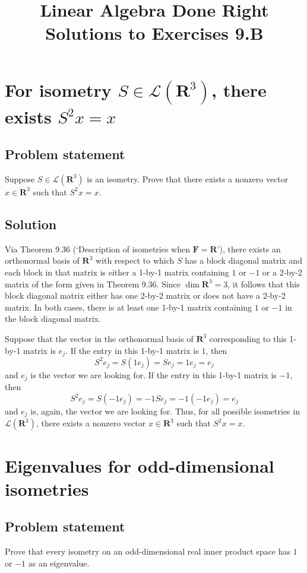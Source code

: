 \documentclass{article}
\title{Linear Algebra Done Right\\Solutions to Exercises 9.B}
\author{}
\date{}
\begin{document}
\maketitle

\section{For isometry $S\in\mathcal{L}(\mathbf{R}^3)$, there exists $S^2x=x$}
\subsection*{Problem statement}
Suppose $S\in\mathcal{L}(\mathbf{R}^3)$ is an isometry. 
Prove that there exists a nonzero vector $x\in\mathbf{R}^3$ such that $S^2x=x$.

\subsection*{Solution}
Via Theorem 9.36 (`Description of isometries when $\mathbf{F}=\mathbf{R}$'), there exists an orthonormal basis of $\mathbf{R}^3$ with respect to which $S$ has a block diagonal matrix and each block in that matrix is either a 1-by-1 matrix containing $1$ or $-1$ or a 2-by-2 matrix of the form given in Theorem 9.36. 
Since $\operatorname{dim}\mathbf{R}^3=3$, it follows that this block diagonal matrix either has one 2-by-2 matrix or does not have a 2-by-2 matrix. In both cases, there is at least one 1-by-1 matrix containing $1$ or $-1$ in the block diagonal matrix. 

Suppose that the vector in the orthonormal basis of $\mathbf{R}^3$ corresponding to this 1-by-1 matrix is $e_j$. 
If the entry in this 1-by-1 matrix is $1$, then 
\[S^2e_j=S(1e_j)=Se_j=1e_j=e_j\]
and $e_j$ is the vector we are looking for. 
If the entry in this 1-by-1 matrix is $-1$, then
\[S^2e_j=S(-1e_j)=-1Se_j=-1(-1e_j)=e_j\]
and $e_j$ is, again, the vector we are looking for. 
Thus, for all possible isometries in $\mathcal{L}(\mathbf{R}^3)$, there exists a nonzero vector $x\in\mathbf{R}^3$ such that $S^2x=x$.

\clearpage

\section{Eigenvalues for odd-dimensional isometries}
\subsection*{Problem statement}
Prove that every isometry on an odd-dimensional real inner product space has $1$ or $-1$ as an eigenvalue.
\end{document}
